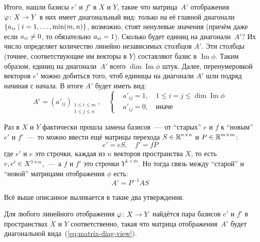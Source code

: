 \documentclass[a4paper,12pt]{article}
\DeclareMathOperator{\Imag}{Im}
\begin{document}
  Итого, нашли базисы $e'$ и $f'$ в $X$ и $Y$, такие что матрица~$A'$ отображения $\phi\colon X \hm\to Y$ в них имеет диагональный вид: только на её главной диагонали $\{a_{ii} \hm\mid i \hm= 1, \ldots, \min(m, n)\}$, возможно, стоят ненулевые значения (причём даже если $a_{ii} \hm{\not=} 0$, то обязательно $a_{ii} \hm= 1$).
  Сколько будет единиц на диагонали~$A'$?
  Их число определяет количество линейно независимых столбцов $A'$.
  Эти столбцы (точнее, соответствующие им векторы в $Y$) составляют базис в $\Imag \phi$.
  Таким образом, единиц на диагонали~$A'$ всего $\dim \Imag \phi$ штук.
  Далее, перенумеровкой векторов $e'$ можно добиться того, чтоб единицы на диагонали $A'$ шли подряд начиная с начала.
  В итоге $A'$ будет иметь вид:
  \begin{equation}\label{eq:matrix-diag-view}
    A' = (a'_{ij})_{\substack{1 \leq i \leq m\\ 1 \leq j \leq n}},\quad \left\{
      \begin{aligned}
        &a'_{ij} = 1,\quad 1 \leq i = j \leq \dim\Imag\phi\\
        &a'_{ij} = 0,\quad \mbox{иначе}
      \end{aligned}
    \right.
  \end{equation}
  
  Раз в $X$ и $Y$ фактически прошла замена базисов~---~от ``старых'' $e$ и $f$ к ``новым'' $e'$ и $f'$~---~то можно ввести ещё матрицы перехода $S \hm\in \RR^{n\times n}$ и $P \hm\in \RR^{m\times m}$:
  \[
    e' = e S,\quad f' = f P
  \]
  где $e'$ и $e$ это строчки, каждая из $n$ векторов пространства $X$, то есть $e, e' \hm\in X^{1\times n}$,~---~а $f$ и $f'$ это строчки $Y^{1\times m}$.
  Но тогда связь между ``старой'' и ``новой'' матрицами отображения $\phi$ есть:
  \begin{equation}\label{eq:matrix-change1}
    A' = P^{-1} A S
  \end{equation}
  
  Всё выше описанное выливается в такие два утверждения.
  
  \begin{theorem}
    Для любого линейного отображения $\phi\colon X \hm\to Y$ найдётся пара базисов $e'$ и $f'$ в пространствах $X$ и $Y$ соответственно, такая что матрица отображения~$A'$ будет диагональной вида~(\ref{eq:matrix-diag-view}). 
  \end{theorem}
  
\end{document}
